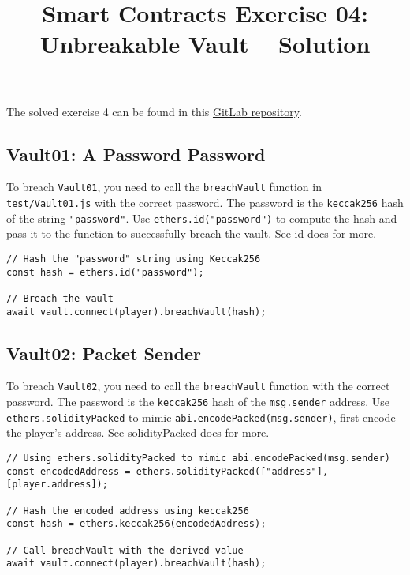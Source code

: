 \documentclass[12pt]{article}
\title{Smart Contracts Exercise 04: \\ Unbreakable Vault -- Solution}
\author{}
\date{}
\begin{document}
\maketitle

\noindent
The solved exercise 4 can be found in this \href{https://gitlab.fel.cvut.cz/radovluk/smart-contracts-exercises/-/tree/main/04-Unbreakable-Vault/solution/solution-code?ref_type=heads}{GitLab repository}.

\subsection*{Vault01: A Password Password}

To breach \texttt{Vault01}, you need to call the \texttt{breachVault} function in \texttt{test/Vault01.js} with the correct password. The password is the \texttt{keccak256} hash of the string \texttt{"password"}. Use \texttt{ethers.id("password")} to compute the hash and pass it to the function to successfully breach the vault. See \href{https://docs.ethers.org/v6/api/hashing/\#id}{id docs} for more.


\begin{verbatim}
// Hash the "password" string using Keccak256
const hash = ethers.id("password");

// Breach the vault
await vault.connect(player).breachVault(hash);
\end{verbatim}

\subsection*{Vault02: Packet Sender}

To breach \texttt{Vault02}, you need to call the \texttt{breachVault} function with the correct password. The password is the \texttt{keccak256} hash of the \texttt{msg.sender} address. Use \texttt{ethers.solidityPacked} to mimic \texttt{abi.encodePacked(msg.sender)}, first encode the player's address. See \href{https://docs.ethers.org/v6/api/hashing/\#solidityPacked}{solidityPacked docs} for more.

\begin{verbatim}
// Using ethers.solidityPacked to mimic abi.encodePacked(msg.sender)
const encodedAddress = ethers.solidityPacked(["address"], [player.address]);

// Hash the encoded address using keccak256
const hash = ethers.keccak256(encodedAddress);

// Call breachVault with the derived value
await vault.connect(player).breachVault(hash);
\end{verbatim}
\end{document}
